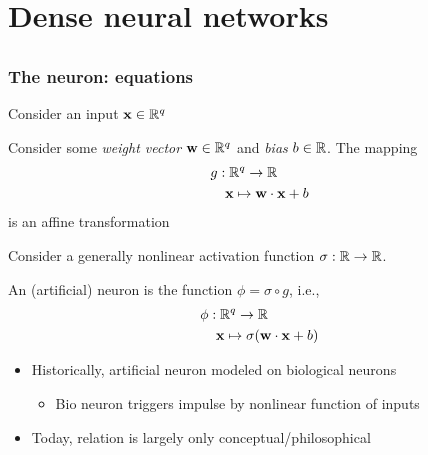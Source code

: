 \section[Dense NNs]{Dense neural networks}

\subsection{}

\begin{frame}
    \frametitle{The neuron: equations}

    Consider an input $\mathbf{x} \in \mathbb{R}^q$
    \begin{block}{}
        Consider some \emph{weight vector} $\mathbf{w} \in \mathbb{R}^q$ and \emph{bias} $b \in \mathbb{R}$.
        The mapping
        \begin{align*}
            g &: \mathbb{R}^q \to \mathbb{R} \\
            &\hspace{1.25ex} \mathbf{x} \mapsto \mathbf{w} \cdot \mathbf{x} + b
        \end{align*}
        is an \alert{affine transformation}
    \end{block}
    \pause

    Consider a generally nonlinear \alert{activation function} $\sigma: \mathbb{R} \to \mathbb{R}$.

    \begin{block}{}
        An (artificial) \alert{neuron} is the function $\phi = \sigma \circ g$, i.e.,
        \begin{align*}
            \phi &: \mathbb{R}^q \to \mathbb{R} \\
            &\hspace{1.25ex} \mathbf{x} \mapsto \sigma(\mathbf{w} \cdot \mathbf{x} + b)
        \end{align*}
    \end{block}
    \pause

    \begin{itemize}
        \item Historically, artificial neuron modeled on biological neurons
        \begin{itemize}
            \item Bio neuron triggers impulse by nonlinear function of inputs
        \end{itemize}
        \item Today, relation is largely only conceptual/philosophical
    \end{itemize}
\end{frame}

